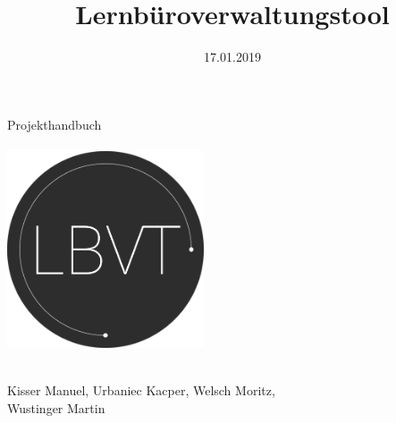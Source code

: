 \documentclass[minted, notitle]{protocol}
\title{Lernbüroverwaltungstool} %
\date{17.01.2019} %
\begin{document}
\begin{titlepage} %
	\raggedleft %
	
	\begingroup \color{gray}{\rule{3pt}{\textheight}} \endgroup %
	\hspace{0.05\textwidth} %
	\parbox[b]{0.75\textwidth}{ %
		{{\fontsize{27}{48} \selectfont  Projekthandbuch}} \\	\vspace{0.146\textheight} \\
		
		{\includegraphics[width=220]{images/Logo_1.png}} \\[2\baselineskip]
		{{\fontsize{20}{48} \selectfont \thetitle}} \\ %
		{\vspace{-0.5cm}\large \begin{flushleft}Kisser Manuel, Urbaniec Kacper, Welsch Moritz, \\Wustinger Martin\end{flushleft}}\\ [1\baselineskip]
		
}
\end{titlepage}
\end{document}
